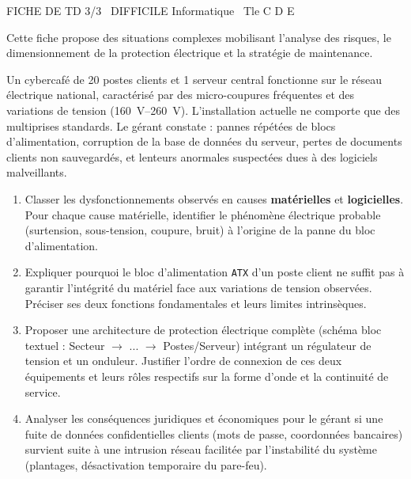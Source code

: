 \documentclass[11pt]{article}
\begin{document}
\begin{tcolorbox}[enhanced,colback=popink,colframe=popink,arc=10pt,boxrule=0pt,left=12pt,right=12pt,top=9pt,bottom=9pt]
{\color{white}\popxbold\small FICHE DE TD 3/3 \textbullet\ DIFFICILE \hfill Informatique \textbullet\ Tle C D E\par}
\end{tcolorbox}
\vspace{4pt}
Cette fiche propose des situations complexes mobilisant l'analyse des risques, le dimensionnement de la protection électrique et la stratégie de maintenance.

\begin{exercice}
Un cybercafé de 20 postes clients et 1 serveur central fonctionne sur le réseau électrique national, caractérisé par des micro-coupures fréquentes et des variations de tension (\SIrange{160}{260}{\volt}). L'installation actuelle ne comporte que des multiprises standards. Le gérant constate : pannes répétées de blocs d'alimentation, corruption de la base de données du serveur, pertes de documents clients non sauvegardés, et lenteurs anormales suspectées dues à des logiciels malveillants.
\begin{enumerate}
    \item Classer les dysfonctionnements observés en causes \textbf{matérielles} et \textbf{logicielles}. Pour chaque cause matérielle, identifier le phénomène électrique probable (surtension, sous-tension, coupure, bruit) à l'origine de la panne du bloc d'alimentation.
    \item Expliquer pourquoi le bloc d'alimentation \texttt{ATX} d'un poste client ne suffit pas à garantir l'intégrité du matériel face aux variations de tension observées. Préciser ses deux fonctions fondamentales et leurs limites intrinsèques.
    \item Proposer une architecture de protection électrique complète (schéma bloc textuel : Secteur $\rightarrow$ ... $\rightarrow$ Postes/Serveur) intégrant un régulateur de tension et un onduleur. Justifier l'ordre de connexion de ces deux équipements et leurs rôles respectifs sur la forme d'onde et la continuité de service.
    \item Analyser les conséquences juridiques et économiques pour le gérant si une fuite de données confidentielles clients (mots de passe, coordonnées bancaires) survient suite à une intrusion réseau facilitée par l'instabilité du système (plantages, désactivation temporaire du pare-feu).
\end{enumerate}
\end{exercice}
\end{document}

